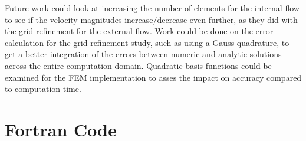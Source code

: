 \documentclass[conf]{new-aiaa}
\begin{document}
Future work could look at increasing the number of elements for the internal flow to see if the velocity magnitudes increase/decrease even further, as they did with the grid refinement for the external flow.  Work could be done on the error calculation for the grid refinement study, such as using a Gauss quadrature, to get a better integration of the errors between numeric and analytic solutions across the entire computation domain.  Quadratic basis functions could be examined for the FEM implementation to asses the impact on accuracy compared to computation time.

\newpage


\newpage
\section*{Fortran Code}


\end{document}
